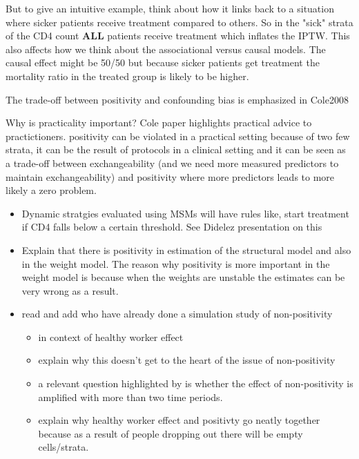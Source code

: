 \documentclass[11pt]{article}
\providecommand{\tightlist}{%
      \setlength{\itemsep}{0pt}\setlength{\parskip}{0pt}}
\begin{document}
But to give an intuitive example, think about how it links back to a
situation where sicker patients receive treatment compared to others. So
in the "sick" strata of the CD4 count \textbf{ALL} patients receive
treatment which inflates the IPTW. This also affects how we think about
the associational versus causal models. The causal effect might be 50/50
but because sicker patients get treatment the mortality ratio in the
treated group is likely to be higher.

The trade-off between positivity and confounding bias is emphasized in
Cole2008

Why is practicality important? Cole paper highlights practical advice to
practictioners. positivity can be violated in a practical setting
because of two few strata, it can be the result of protocols in a
clinical setting and it can be seen as a trade-off between
exchangeability (and we need more measured predictors to maintain
exchangeability) and positivity where more predictors leads to more
likely a zero problem.

\begin{itemize}
\tightlist
\item
  Dynamic stratgies evaluated using MSMs will have rules like, start
  treatment if CD4 falls below a certain threshold. See Didelez
  presentation on this
\item
  Explain that there is positivity in estimation of the structural model
  and also in the weight model. The reason why positivity is more
  important in the weight model is because when the weights are unstable
  the estimates can be very wrong as a result.
\item
  read and add \citet{Naimi2011} who have already done a simulation
  study of non-positivity

  \begin{itemize}
  \tightlist
  \item
    in context of healthy worker effect
  \item
    explain why this doesn't get to the heart of the issue of
    non-positivity
  \item
    a relevant question highlighted by \citet{Naimi2011} is whether the
    effect of non-positivity is amplified with more than two time
    periods.
  \item
    explain why healthy worker effect and positivty go neatly together
    because as a result of people dropping out there will be empty
    cells/strata.
  \end{itemize}
\end{itemize}
\end{document}
